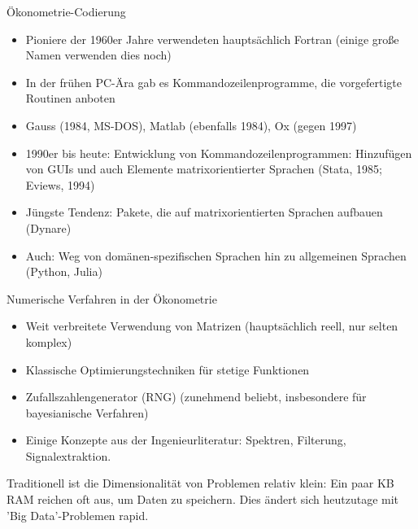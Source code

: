 \documentclass{beamer}[11pt]
\begin{document}
\begin{frame}{Ökonometrie-Codierung}
	\begin{itemize}
		\item Pioniere der 1960er Jahre verwendeten hauptsächlich Fortran (einige große Namen verwenden dies noch)
		\item In der frühen PC-Ära gab es Kommandozeilenprogramme, die vorgefertigte Routinen anboten
		\item Gauss (1984, MS-DOS), Matlab (ebenfalls 1984), Ox (gegen 1997)
		\item 1990er bis heute: Entwicklung von Kommandozeilenprogrammen: Hinzufügen von GUIs und auch Elemente matrixorientierter Sprachen (Stata, 1985; Eviews, 1994)
		\item Jüngste Tendenz: Pakete, die auf matrixorientierten Sprachen aufbauen (Dynare)
		\item Auch: Weg von domänen-spezifischen Sprachen hin zu allgemeinen Sprachen (Python, Julia)
	\end{itemize}
\end{frame}


\begin{frame}{Numerische Verfahren in der Ökonometrie}
	\begin{itemize}
		\item Weit verbreitete Verwendung von Matrizen (hauptsächlich reell, nur selten komplex)
		\item Klassische Optimierungstechniken für stetige Funktionen %
		\item Zufallszahlengenerator (RNG) (zunehmend beliebt, insbesondere für bayesianische Verfahren)
		\item Einige Konzepte aus der Ingenieurliteratur: Spektren, Filterung, Signalextraktion.
	\end{itemize}
	\medskip

	Traditionell ist die Dimensionalität von Problemen relativ klein: Ein paar KB RAM reichen oft aus, um Daten zu speichern. Dies ändert sich heutzutage mit 'Big Data'-Problemen rapid.
\end{frame}
\end{document}
